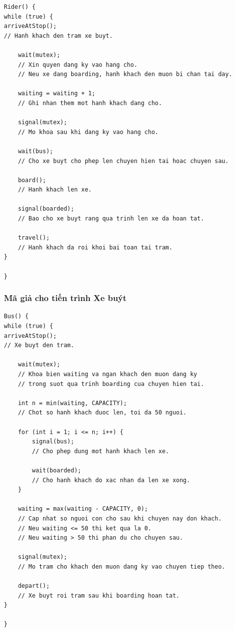 \begin{lstlisting}
Rider() {
while (true) {
arriveAtStop();
// Hanh khach den tram xe buyt.

    wait(mutex);
    // Xin quyen dang ky vao hang cho.
    // Neu xe dang boarding, hanh khach den muon bi chan tai day.

    waiting = waiting + 1;
    // Ghi nhan them mot hanh khach dang cho.

    signal(mutex);
    // Mo khoa sau khi dang ky vao hang cho.

    wait(bus);
    // Cho xe buyt cho phep len chuyen hien tai hoac chuyen sau.

    board();
    // Hanh khach len xe.

    signal(boarded);
    // Bao cho xe buyt rang qua trinh len xe da hoan tat.

    travel();
    // Hanh khach da roi khoi bai toan tai tram.
}

}
\end{lstlisting}

\subsubsection*{Mã giả cho tiến trình Xe buýt}

\begin{lstlisting}
Bus() {
while (true) {
arriveAtStop();
// Xe buyt den tram.

    wait(mutex);
    // Khoa bien waiting va ngan khach den muon dang ky
    // trong suot qua trinh boarding cua chuyen hien tai.

    int n = min(waiting, CAPACITY);
    // Chot so hanh khach duoc len, toi da 50 nguoi.

    for (int i = 1; i <= n; i++) {
        signal(bus);
        // Cho phep dung mot hanh khach len xe.

        wait(boarded);
        // Cho hanh khach do xac nhan da len xe xong.
    }

    waiting = max(waiting - CAPACITY, 0);
    // Cap nhat so nguoi con cho sau khi chuyen nay don khach.
    // Neu waiting <= 50 thi ket qua la 0.
    // Neu waiting > 50 thi phan du cho chuyen sau.

    signal(mutex);
    // Mo tram cho khach den muon dang ky vao chuyen tiep theo.

    depart();
    // Xe buyt roi tram sau khi boarding hoan tat.
}

}
\end{lstlisting}


